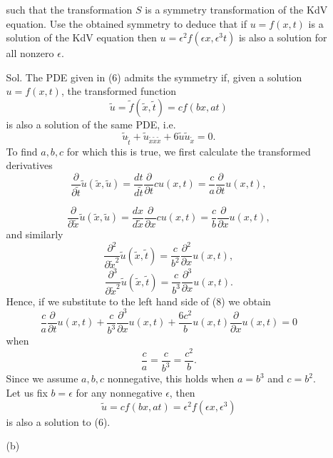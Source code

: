 \documentclass[]{report}
\begin{document}
\begin{itemize}
\begin{itemize}
		such that the transformation $S$ is a symmetry transformation of the KdV equation. Use the obtained symmetry to deduce that if $u = f(x, t)$ is a solution of the KdV equation then $u = \epsilon^2f(\epsilon x, \epsilon^3 t)$ is also a solution for all nonzero $\epsilon$.
		\item[Sol.] The PDE given in (6) admits the symmetry if, given a solution $u = f(x, t)$, the transformed function \[\tilde{u} = \tilde{f}(\tilde{x},\tilde{t})=cf(bx,at)\] 
		is also a solution of the same PDE, i.e.
		\begin{equation}
			\tilde{u}_{\tilde{t}} + \tilde{u}_{\tilde{x}\tilde{x}\tilde{x}} + 6\tilde{u}\tilde{u}_{\tilde{x}} = 0.
		\end{equation}
		To find $a,b,c$ for which this is true, we first calculate the transformed derivatives
		\[\frac{\partial}{\partial\tilde{t}}\tilde{u}(\tilde{x},\tilde{u})=\frac{dt}{d\tilde{t}}\frac{\partial}{\partial t}cu(x,t)=\frac{c}{a}\frac{\partial}{\partial t} u(x,t),\]
		
		\[\frac{\partial}{\partial\tilde{x}}\tilde{u}(\tilde{x},\tilde{u})=\frac{dx}{d\tilde{x}}\frac{\partial}{\partial x}cu(x,t)=\frac{c}{b}\frac{\partial}{\partial x} u(x,t),\]
		and similarly
		\[\frac{\partial^2}{\partial\tilde{x}^2}\tilde{u}(\tilde{x},\tilde{t})=\frac{c}{b^2}\frac{\partial^2}{\partial x}u(x,t),\]
		\[\frac{\partial^3}{\partial\tilde{x}^2}\tilde{u}(\tilde{x},\tilde{t})=\frac{c}{b^3}\frac{\partial^3}{\partial x}u(x,t).\]
		Hence, if we substitute to the left hand side of (8) we obtain
		\[\frac{c}{a}\frac{\partial}{\partial t} u(x,t)+\frac{c}{b^3}\frac{\partial^3}{\partial x}u(x,t) + \frac{6c^2}{b}u(x,t)\frac{\partial}{\partial x} u(x,t)=0\]
		when
		\[\frac{c}{a}=\frac{c}{b^3}=\frac{c^2}{b}.\]
		Since we assume $a,b,c$ nonnegative, this holds when $a=b^3$ and $c=b^2$. Let us fix $b=\epsilon$ for any nonnegative $\epsilon$, then 
		\[\tilde{u} = cf(bx,at) = \epsilon^2f(\epsilon x, \epsilon^3)\]
		is also a solution to (6). 
		\item[(b)]
	\end{itemize}

\end{itemize}
\end{document}
